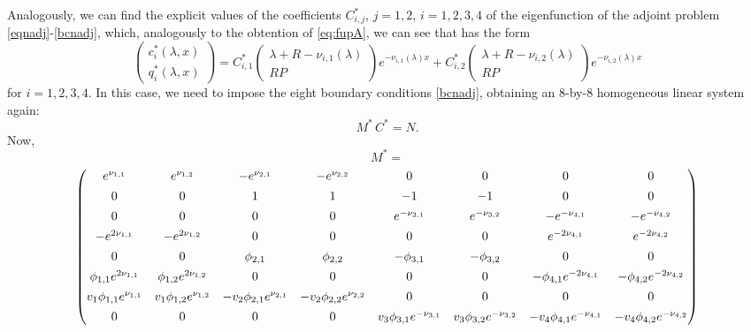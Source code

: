 \documentclass[a4paper]{article}
\newcommand{\X}[3]{#1_{#3,#2}}
\newcommand{\Xe}[3]{#1^*_{#3,#2}}
\numberwithin{equation}{section}
\begin{document}
Analogously, we can find the explicit values of the coefficients $\Xe{C}{j}{i}$, $j=1,2$, $i=1,2,3,4$ of the eigenfunction of the adjoint problem \eqref{eqnadj}-\eqref{bcnadj}, which, analogously to the obtention of \eqref{eq:fupA}, we can see that has the form
\begin{equation}\label{eq:fupAadj}
\begin{pmatrix} c_i^*(\lambda,x) \\ q_i^*(\lambda,x) \end{pmatrix} = \Xe{C}{1}{i}\begin{pmatrix} \lambda + R - \X{\nu}{1}{i}(\lambda) \\ RP \end{pmatrix} e^{-\X{\nu}{1}{i}(\lambda)x} + \Xe{C}{2}{i}\begin{pmatrix} \lambda + R - \X{\nu}{2}{i}(\lambda) \\ RP \end{pmatrix} e^{-\X{\nu}{2}{i}(\lambda)x}
\end{equation}
for $i = 1, 2, 3, 4$. In this case, we need to impose the eight boundary conditions \eqref{bcnadj}, obtaining an 8-by-8 homogeneous linear system again:
\begin{equation}\label{eq:sistCijadj}
M^*\, C^*=N.
\end{equation}
Now,
$$M^*=$$
\tiny
$$
\begin{pmatrix}
e^{\X{\nu}{1}{1}} & e^{\X{\nu}{2}{1}} & -e^{\X{\nu}{1}{2}} & -e^{\X{\nu}{2}{2}} & 0 & 0 & 0 & 0 \vspace{0.15cm}\\
0 & 0 & 1 & 1 & -1 & -1 & 0 & 0\vspace{0.15cm}\\
0 & 0 & 0 & 0 & e^{-\X{\nu}{1}{3}} & e^{-\X{\nu}{2}{3}} & -e^{-\X{\nu}{1}{4}} & -e^{-\X{\nu}{2}{4}}\vspace{0.15cm} \\
-e^{2\X{\nu}{1}{1}} & -e^{2\X{\nu}{2}{1}} &0 & 0 & 0 & 0 & e^{-2\X{\nu}{1}{4}} & e^{-2\X{\nu}{2}{4}}\vspace{0.15cm}\\
0 & 0 & \X{\phi}{1}{2} & \X{\phi}{2}{2} & -\X{\phi}{1}{3} & -\X{\phi}{2}{3} & 0 & 0\vspace{0.15cm}\\
\X{\phi}{1}{1}e^{2\X{\nu}{1}{1}} & \X{\phi}{2}{1}e^{2\X{\nu}{2}{1}} &0 & 0 & 0 & 0 & -\X{\phi}{1}{4}e^{-2\X{\nu}{1}{4}} & -\X{\phi}{2}{4}e^{-2\X{\nu}{2}{4}}\vspace{0.15cm}\\
v_1\X{\phi}{1}{1}e^{\X{\nu}{1}{1}} & v_1\X{\phi}{2}{1}e^{\X{\nu}{2}{1}} & -v_2\X{\phi}{1}{2}e^{\X{\nu}{1}{2}} & -v_2\X{\phi}{2}{2}e^{\X{\nu}{2}{2}} & 0 & 0 & 0 & 0\vspace{0.15cm}\\
0 & 0 & 0 & 0 & v_3\X{\phi}{1}{3}e^{-\X{\nu}{1}{3}} & v_3\X{\phi}{2}{3}e^{-\X{\nu}{2}{3}} & -v_4\X{\phi}{1}{4}e^{-\X{\nu}{1}{4}} & -v_4\X{\phi}{2}{4}e^{-\X{\nu}{2}{4}}
\end{pmatrix}
$$
\end{document}
